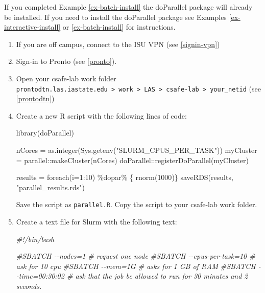 \documentclass[
]{book}
\newenvironment{Shaded}{\begin{snugshade}}{\end{snugshade}}
\newcommand{\AttributeTok}[1]{\textcolor[rgb]{0.77,0.63,0.00}{#1}}
\newcommand{\CommentTok}[1]{\textcolor[rgb]{0.56,0.35,0.01}{\textit{#1}}}
\newcommand{\DecValTok}[1]{\textcolor[rgb]{0.00,0.00,0.81}{#1}}
\newcommand{\FunctionTok}[1]{\textcolor[rgb]{0.00,0.00,0.00}{#1}}
\newcommand{\NormalTok}[1]{#1}
\newcommand{\OtherTok}[1]{\textcolor[rgb]{0.56,0.35,0.01}{#1}}
\newcommand{\SpecialCharTok}[1]{\textcolor[rgb]{0.00,0.00,0.00}{#1}}
\newcommand{\StringTok}[1]{\textcolor[rgb]{0.31,0.60,0.02}{#1}}
\begin{document}
If you completed Example \ref{ex-batch-install} the doParallel package will already be installed. If you need to install the doParallel package see Examples \ref{ex-interactive-install} or \ref{ex-batch-install} for instructions.

\begin{enumerate}
\def\labelenumi{\arabic{enumi}.}
\item
  If you are off campus, connect to the ISU VPN (see \ref{signin-vpn})
\item
  Sign-in to Pronto (see \ref{pronto}).
\item
  Open your csafe-lab work folder \texttt{prontodtn.las.iastate.edu\ \textgreater{}\ work\ \textgreater{}\ LAS\ \textgreater{}\ csafe-lab\ \textgreater{}\ your\_netid} (see \ref{prontodtn})
\item
  Create a new R script with the following lines of code:

\begin{Shaded}
\begin{Highlighting}[]
\FunctionTok{library}\NormalTok{(doParallel)}

\NormalTok{nCores }\OtherTok{=} \FunctionTok{as.integer}\NormalTok{(}\FunctionTok{Sys.getenv}\NormalTok{(}\StringTok{"SLURM\_CPUS\_PER\_TASK"}\NormalTok{))}
\NormalTok{myCluster }\OtherTok{=}\NormalTok{ parallel}\SpecialCharTok{::}\FunctionTok{makeCluster}\NormalTok{(nCores)}
\NormalTok{doParallel}\SpecialCharTok{::}\FunctionTok{registerDoParallel}\NormalTok{(myCluster)}

\NormalTok{results }\OtherTok{=} \FunctionTok{foreach}\NormalTok{(}\AttributeTok{i=}\DecValTok{1}\SpecialCharTok{:}\DecValTok{10}\NormalTok{) }\SpecialCharTok{\%dopar\%}\NormalTok{ \{}
  \FunctionTok{rnorm}\NormalTok{(}\DecValTok{1000}\NormalTok{)\}}
\FunctionTok{saveRDS}\NormalTok{(results, }\StringTok{"parallel\_results.rds"}\NormalTok{)}
\end{Highlighting}
\end{Shaded}

  Save the script as \texttt{parallel.R}. Copy the script to your csafe-lab work folder.
\item
  Create a text file for Slurm with the following text:

\begin{Shaded}
\begin{Highlighting}[]
\CommentTok{\#!/bin/bash}

\CommentTok{\#SBATCH {-}{-}nodes=1 \# request one node}
\CommentTok{\#SBATCH {-}{-}cpus{-}per{-}task=10  \# ask for 10 cpu}
\CommentTok{\#SBATCH {-}{-}mem=1G \#  asks for 1 GB of RAM}
\CommentTok{\#SBATCH {-}{-}time=00:30:02 \# ask that the job be allowed to run for 30 minutes and 2 seconds.}


\end{Highlighting}
\end{Shaded}
\end{enumerate}
\end{document}

